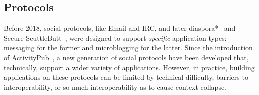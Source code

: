 





\subsection{Protocols}
\label{related-work:protocols}

Before 2018, social protocols, like Email and IRC,
and later diaspora*~\cite{diaspora} and Secure ScuttleButt~\cite{scuttlebutt},
were designed to support \emph{specific} application types:
messaging for the former and microblogging for the latter.
Since the introduction of ActivityPub~\cite{activitypub},
a new generation of social protocols have
been developed that, technically, support a wider variety of applications.
However, in practice,
building applications on these protocols can be limited by technical
difficulty, barriers to interoperability, or so much interoperability
as to cause context collapse.

